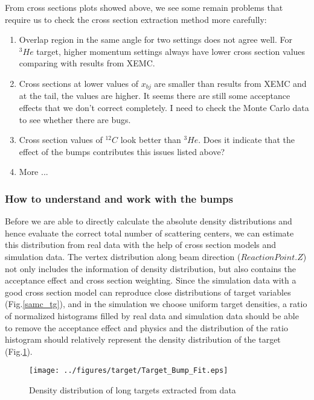 \documentclass[a4paper,18.pt]{article}
\begin{document}
 From cross sections plots showed above, we see some remain problems that require us to check the cross section extraction method more carefully:
 \begin{enumerate}
\item  Overlap region in the same angle for two settings does not agree well. For $^{3}He$ target, higher momentum settings always have lower cross section values comparing with results from XEMC.     
\item  Cross sections at lower values of $x_{bj}$ are smaller than results from XEMC and at the tail, the values are higher. It seems there are still some acceptance effects that we don't correct completely. I need to check the Monte Carlo data to see whether there are bugs.
\item  Cross section values of $^{12}C$ look better than $^{3}He$. Does it indicate that the effect of the bumps contributes this issues listed above? 
\item   More ...
\end{enumerate}

\subsubsection{How to understand and work with the bumps}

Before we are able to directly calculate the absolute density distributions and hence evaluate the correct total number of scattering centers, we can estimate this distribution from real data with the help of cross section models and simulation data. The vertex distribution along beam direction ($ReactionPoint.Z$) not only includes the information of density distribution, but also contains the acceptance effect and cross section weighting. Since the simulation data with a good cross section model can reproduce close distributions of target variables (Fig.\ref{samc_tg}), and in the simulation we choose uniform target densities, a ratio of normalized histograms filled by real data and simulation data should be able to remove the acceptance effect and physics and the distribution of the ratio histogram should relatively represent the density distribution of the target (Fig.\ref{long_target_dis}).

\begin{figure}[ht]
 \begin{center}
  \texttt{[image: ../figures/target/Target\_Bump\_Fit.eps]}
  \caption[Density distribution of long targets extracted from data]{Density distribution of long targets extracted from data}
  \label{long_target_dis}
 \end{center}
\end{figure}
\end{document}
